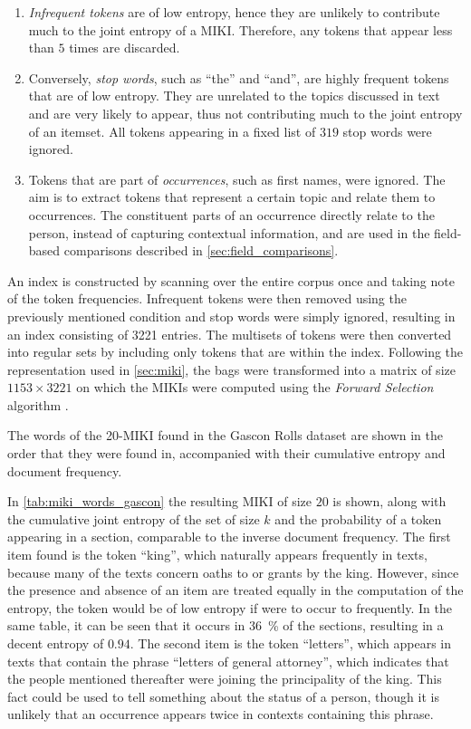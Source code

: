 \begin{enumerate}
    \item \emph{Infrequent tokens} are of low entropy, hence they are unlikely to contribute much to the joint entropy of a MIKI. Therefore, any tokens that appear less than $5$ times are discarded.
    \item Conversely, \emph{stop words}, such as ``the'' and ``and'', are highly frequent tokens that are of low entropy. They are unrelated to the topics discussed in text and are very likely to appear, thus not contributing much to the joint entropy of an itemset. All tokens appearing in a fixed list of $319$ stop words were ignored.
    \item Tokens that are part of \emph{occurrences}, such as first names, were ignored. The aim is to extract tokens that represent a certain topic and relate them to occurrences. The constituent parts of an occurrence directly relate to the person, instead of capturing contextual information, and are used in the field-based comparisons described in \cref{sec:field_comparisons}.
\end{enumerate}

An index is constructed by scanning over the entire corpus once and taking note of the token frequencies.
Infrequent tokens were then removed using the previously mentioned condition and stop words were simply ignored, resulting in an index consisting of \num{3221} entries.
The multisets of tokens were then converted into regular sets by including only tokens that are within the index. 
Following the representation used in \cref{sec:miki}, the bags were transformed into a matrix of size $\num{1153} \times \num{3221}$ on which the MIKIs were computed using the \emph{Forward Selection} algorithm \citep{Knobbe2006}.

\begin{table}
    \centering
    
    \caption{The words of the 20-MIKI found in the Gascon Rolls dataset are shown in the order that they were found in, accompanied with their cumulative entropy and document frequency.}
    \label{tab:miki_words_gascon}
\end{table}

In \cref{tab:miki_words_gascon} the resulting MIKI of size $20$ is shown, along with the cumulative joint entropy of the set of size $k$ and the probability of a token appearing in a section, comparable to the inverse document frequency.
The first item found is the token ``king'', which naturally appears frequently in texts, because many of the texts concern oaths to or grants by the king.
However, since the presence and absence of an item are treated equally in the computation of the entropy, the token would be of low entropy if were to occur to frequently.
In the same table, it can be seen that it occurs in \SI{36}{\percent} of the sections, resulting in a decent entropy of $0.94$.
The second item is the token ``letters'', which appears in texts that contain the phrase ``letters of general attorney'', which indicates that the people mentioned thereafter were joining the principality of the king.
This fact could be used to tell something about the status of a person, though it is unlikely that an occurrence appears twice in contexts containing this phrase.

